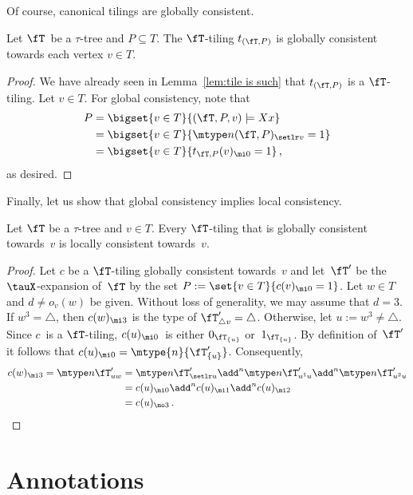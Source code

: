 \documentclass{LMCS}
\begin{document}
Of course, canonical tilings are globally consistent.
\begin{lem}\label{lem:tiling is such}
Let $\fT$~be a $\tau$-tree and $P \subseteq T$.
The $\fT$-tiling $t_{(\fT,P)}$ is
globally consistent towards each vertex $v\in T$.
\end{lem}
\begin{proof}
We have already seen in Lemma~\ref{lem:tile is such} that $t_{(\fT,P)}$ is a $\fT$-tiling.
Let $v \in T$. For global consistency, note that
\begin{align*}
  P &= \bigset{v\in T}{ (\fT,P,v) \models Xx} \\
    &= \bigset{v\in T}{\mtype n{(\fT,P)_{\setlr v}}=1} \\
    &= \bigset{v\in T}{t_{\fT,P}(v)_{\mi0}=1}\,,
\end{align*}
as desired.
\end{proof}

Finally, let us show that global consistency implies
local consistency.
\begin{lem}\label{lem:global implies local for tiling}
Let $\fT$ be a $\tau$-tree and $v\in T$.
Every $\fT$-tiling that is globally consistent towards~$v$
is locally consistent towards~$v$.
\end{lem}

\begin{proof}
Let $c$ be a $\fT$-tiling globally consistent towards~$v$
and let~$\fT'$ be the $\tauX$-expansion of~$\fT$ by the set
$P := \set{v\in T}{c(v)_{\mi0}=1}$.
Let $w\in T$ and $d \neq o_v(w)$ be given.
Without loss of generality, we may assume that $d=3$.
If $w^3 = \triangle$, then $c(w)_{\mi 3}$ is the type of
$\fT'_{\triangle v} = \triangle$.
Otherwise, let $u := w^3 \neq \triangle$.
Since $c$~is a $\fT$-tiling, $c(u)_{\mi 0}$~is either $0_{\fT_{\{u\}}}$
or~$1_{\fT_{\{u\}}}$. By definition of~$\fT'$ it follows that
$c(u)_{\mi 0} = \mtype{n}{\fT'_{\{u\}}}$. Consequently,
\begin{align*}
  c(w)_{\mi 3}
   = \mtype n{\fT'_{uw}}
  &= \mtype n{\fT'_{\setlr u}}
     \add^n \mtype n{\fT'_{u^1u}}
     \add^n \mtype n{\fT'_{u^2u}} \\
  &= c(u)_{\mi0} \add^n c(u)_{\mi1} \add^n c(u)_{\mi2} \\
  &= c(u)_{\mo 3}\,.
\end{align*}
\end{proof}



\section{Annotations}
\label{sect:annots}
\end{document}
